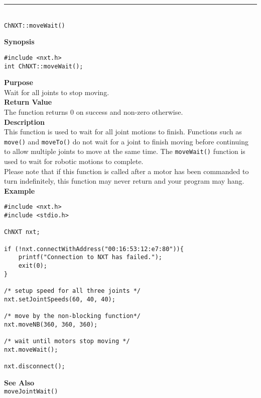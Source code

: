 \noindent
\vspace{5pt}
\rule{4.5in}{0.015in}\\
\noindent
{\LARGE \texttt{ChNXT::moveWait()}}\\
{}

\noindent
{\bf Synopsis}
\vspace{-8pt}
\begin{verbatim}
#include <nxt.h>
int ChNXT::moveWait();
\end{verbatim}

\noindent
{\bf Purpose}\\
Wait for all joints to stop moving.\\

\noindent
{\bf Return Value}\\
The function returns 0 on success and non-zero otherwise.\\

\noindent
{\bf Description}\\
This function is used to wait for all joint motions to finish. Functions such as
\texttt{move()} and \texttt{moveTo()} do not wait for a joint to finish
moving before continuing to allow multiple joints to move at the same time. The
\texttt{moveWait()} function is used to wait for robotic motions to complete.\\

\noindent
Please note that if this function is called after a motor has been commanded to
turn indefinitely, this function may never return and your program may hang.\\

\noindent
{\bf Example}
\begin{verbatim}
#include <nxt.h> 
#include <stdio.h>

ChNXT nxt;

if (!nxt.connectWithAddress("00:16:53:12:e7:80")){
    printf("Connection to NXT has failed.");
    exit(0);
}
 
/* setup speed for all three joints */
nxt.setJointSpeeds(60, 40, 40);

/* move by the non-blocking function*/
nxt.moveNB(360, 360, 360);

/* wait until motors stop moving */
nxt.moveWait();

nxt.disconnect();
\end{verbatim}


\noindent
{\bf See Also}\\
\texttt{moveJointWait()}

